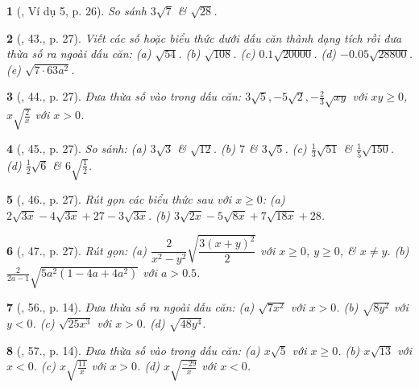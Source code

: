 \documentclass{article}
\newtheorem{baitoan}{}%
\begin{document}
\begin{baitoan}[\cite{SGK_Toan_9_tap_1}, Ví dụ 5, p. 26]
	So sánh $3\sqrt{7}$ \& $\sqrt{28}$.
\end{baitoan}

\begin{baitoan}[\cite{SGK_Toan_9_tap_1}, 43., p. 27]
	Viết các số hoặc biểu thức dưới dấu căn thành dạng tích rồi đưa thừa số ra ngoài dấu căn: (a) $\sqrt{54}$. (b) $\sqrt{108}$. (c) $0.1\sqrt{20000}$. (d) $-0.05\sqrt{28800}$. (e) $\sqrt{7\cdot63a^2}$.
\end{baitoan}

\begin{baitoan}[\cite{SGK_Toan_9_tap_1}, 44., p. 27]
	Đưa thừa số vào trong dấu căn: $3\sqrt{5},-5\sqrt{2},-\frac{2}{3}\sqrt{xy}$ với $xy\ge0$, $x\sqrt{\frac{2}{x}}$ với $x > 0$.
\end{baitoan}

\begin{baitoan}[\cite{SGK_Toan_9_tap_1}, 45., p. 27]
	So sánh: (a) $3\sqrt{3}$ \& $\sqrt{12}$. (b) $7$ \& $3\sqrt{5}$. (c) $\frac{1}{3}\sqrt{51}$ \& $\frac{1}{5}\sqrt{150}$. (d) $\frac{1}{2}\sqrt{6}$ \& $6\sqrt{\frac{1}{2}}$.	
\end{baitoan}

\begin{baitoan}[\cite{SGK_Toan_9_tap_1}, 46., p. 27]
	Rút gọn các biểu thức sau với $x\ge0$: (a) $2\sqrt{3x} - 4\sqrt{3x} + 27 - 3\sqrt{3x}$. (b) $3\sqrt{2x} - 5\sqrt{8x} + 7\sqrt{18x} + 28$.
\end{baitoan}

\begin{baitoan}[\cite{SGK_Toan_9_tap_1}, 47., p. 27]
	Rút gọn: (a) $\dfrac{2}{x^2 - y^2}\sqrt{\dfrac{3(x + y)^2}{2}}$ với $x\ge0$, $y\ge0$, \& $x\ne y$. (b) $\frac{2}{2a - 1}\sqrt{5a^2(1 - 4a + 4a^2)}$ với $a > 0.5$.
\end{baitoan}

\begin{baitoan}[\cite{SBT_Toan_9_tap_1}, 56., p. 14]
	Đưa thừa số ra ngoài dấu căn: (a) $\sqrt{7x^2}$ với $x > 0$. (b) $\sqrt{8y^2}$ với $y < 0$. (c) $\sqrt{25x^3}$ với $x > 0$. (d) $\sqrt{48y^4}$.
\end{baitoan}

\begin{baitoan}[\cite{SBT_Toan_9_tap_1}, 57., p. 14]
	Đưa thừa số vào trong dấu căn: (a) $x\sqrt{5}$ với $x\ge0$. (b) $x\sqrt{13}$ với $x < 0$. (c) $x\sqrt{\frac{11}{x}}$ với $x > 0$. (d) $x\sqrt{\frac{-29}{x}}$  với $x < 0$.
\end{baitoan}
\end{document}
